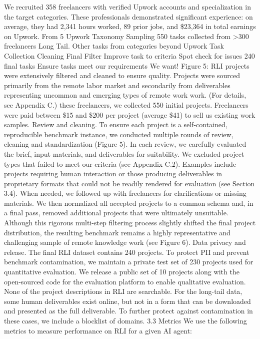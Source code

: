 We recruited 358 freelancers with verified Upwork accounts and
specialization in the target categories. These professionals demonstrated significant experience: on
average, they had 2,341 hours worked, 89 prior jobs, and \$23,364 in total earnings on Upwork. From
5
Upwork Taxonomy
Sampling
550 tasks
collected from
>300 freelancers
Long Tail. Other tasks
from categories beyond
Upwork
Task Collection
Cleaning
    Final Filter
Improve task
to criteria
Spot check
for issues
240 final
tasks
Ensure tasks meet our
requirements
We want!
Figure 5: RLI projects were extensively filtered and cleaned to ensure quality. Projects were sourced
primarily from the remote labor market and secondarily from deliverables representing uncommon
and emerging types of remote work work. (For details, see Appendix C.)
these freelancers, we collected 550 initial projects. Freelancers were paid between \$15 and \$200 per
project (average \$41) to sell us existing work samples.
Review and cleaning.
To ensure each project is a self-contained, reproducible benchmark instance,
we conducted multiple rounds of review, cleaning and standardization (Figure 5). In each review, we
carefully evaluated the brief, input materials, and deliverables for suitability. We excluded project
types that failed to meet our criteria (see Appendix C.2). Examples include projects requiring human
interaction or those producing deliverables in proprietary formats that could not be readily rendered
for evaluation (see Section 3.4). When needed, we followed up with freelancers for clarifications
or missing materials. We then normalized all accepted projects to a common schema and, in a final
pass, removed additional projects that were ultimately unsuitable. Although this rigorous multi-step
filtering process slightly shifted the final project distribution, the resulting benchmark remains a
highly representative and challenging sample of remote knowledge work (see Figure 6).
Data privacy and release.
The final RLI dataset contains 240 projects. To protect PII and prevent
benchmark contamination, we maintain a private test set of 230 projects used for quantitative
evaluation. We release a public set of 10 projects along with the open-sourced code for the evaluation
platform to enable qualitative evaluation. None of the project descriptions in RLI are searchable. For
the long-tail data, some human deliverables exist online, but not in a form that can be downloaded
and presented as the full deliverable. To further protect against contamination in these cases, we
include a blocklist of domains.
3.3
Metrics
We use the following metrics to measure performance on RLI for a given AI agent:
